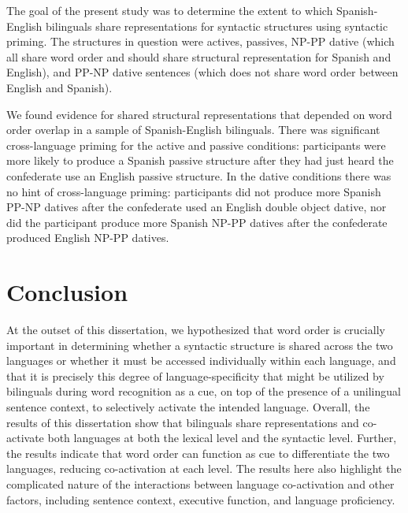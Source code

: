 The goal of the present study was to determine the extent to which Spanish-English bilinguals share representations for syntactic structures using syntactic priming. The structures in question were actives, passives, NP-PP dative (which all share word order and should share structural representation for Spanish and English), and PP-NP dative sentences (which does not share word order between English and Spanish). 

We found evidence for shared structural representations that depended on word order overlap in a sample of Spanish-English bilinguals. There was significant cross-language priming for the active and passive conditions: participants were more likely to produce a Spanish passive structure after they had just heard the confederate use an English passive structure. In the dative conditions there was no hint of cross-language priming: participants did not produce more Spanish PP-NP datives after the confederate used an English double object dative, nor did the participant produce more Spanish NP-PP datives after the confederate produced English NP-PP datives.

\section{Conclusion}
\label{conclusion}

At the outset of this dissertation, we hypothesized that word order is crucially important in determining whether a syntactic structure is shared across the two languages or whether it must be accessed individually within each language, and that it is precisely this degree of language-specificity that might be utilized by bilinguals during word recognition as a cue, on top of the presence of a unilingual sentence context, to selectively activate the intended language. Overall, the results of this dissertation show that bilinguals share representations and co-activate both languages at both the lexical level and the syntactic level. Further, the results indicate that word order can function as cue to differentiate the two languages, reducing co-activation at each level. The results here also highlight the complicated nature of the interactions between language co-activation and other factors, including sentence context, executive function, and language proficiency. 

